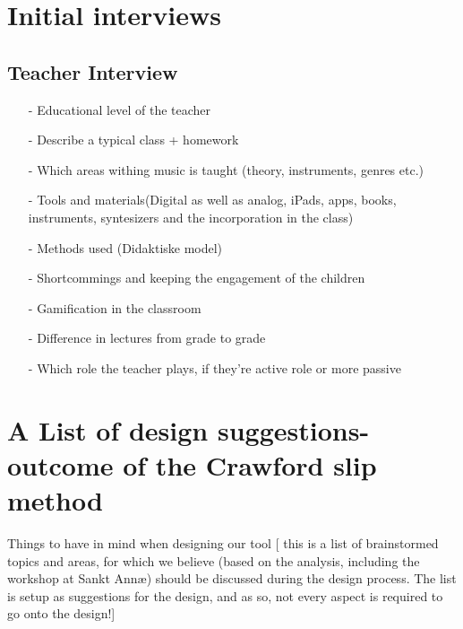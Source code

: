 \section{Initial interviews}\label{sec:initialInterviews}
	\subsection{Teacher Interview}
		\begin{itemize}
		\item[-] Educational level of the teacher 
		\item[-] Describe a typical class + homework
		\item[-] Which areas withing music is taught (theory, instruments, genres etc.)
		\item[-] Tools and materials(Digital as well as analog, iPads, apps, books, instruments, syntesizers and the incorporation in the class)
		\item[-] Methods used (Didaktiske model)
		\item[-] Shortcommings and keeping the engagement of the children
		\item[-] Gamification in the classroom
		\item[-] Difference in lectures from grade to grade
		\item[-] Which role the teacher plays, if they're active role or more passive
		\end{itemize}
	
\section{A List of design suggestions- outcome of the Crawford slip method}\label{CrawfordSlipList}
Things to have in mind when designing our tool
[ this is a list of brainstormed topics and areas, for which we believe (based on the analysis, including the workshop at Sankt Annæ) should be discussed during the design process. The list is setup as suggestions for the design, and as so, not every aspect is required to go onto the design!]

